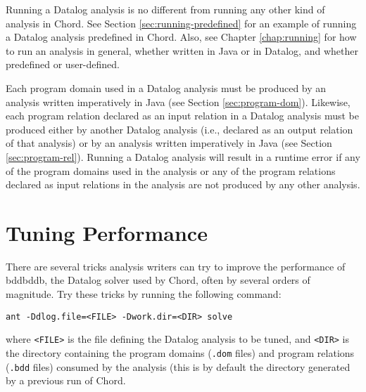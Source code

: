 Running a Datalog analysis is no different from running any other kind of
analysis in Chord.  See Section \ref{sec:running-predefined} for an example of
running a Datalog analysis predefined in Chord.  Also, see Chapter
\ref{chap:running} for how to run an analysis in general, whether written in
Java or in Datalog, and whether predefined or user-defined.

Each program domain used in a Datalog analysis must be
produced by an analysis written imperatively in Java (see Section
\ref{sec:program-dom}).
Likewise, each program relation declared as an input relation in a Datalog analysis must be
produced either by another Datalog analysis (i.e., declared as an output relation
of that analysis) or by an analysis written imperatively in Java (see Section
\ref{sec:program-rel}).
Running a Datalog analysis will result in a runtime error if any of the program
domains used in the analysis or any of the program relations declared as input
relations in the analysis are not produced by any other analysis.

\section{Tuning Performance}
\label{sec:tuning-datalog}

There are several tricks analysis writers can try to improve the
performance of bddbddb, the Datalog solver used by Chord, often
by several orders of magnitude.
Try these tricks by running the following command:

\begin{framed}
\begin{verbatim}
ant -Ddlog.file=<FILE> -Dwork.dir=<DIR> solve
\end{verbatim}
\end{framed}

where {\tt <FILE>} is the file defining the Datalog analysis
to be tuned, and {\tt <DIR>} is the directory containing the
program domains ({\tt *.dom} files) and program relations ({\tt *.bdd} files)
consumed by the analysis (this is by default the
 directory generated
by a previous run of Chord.

